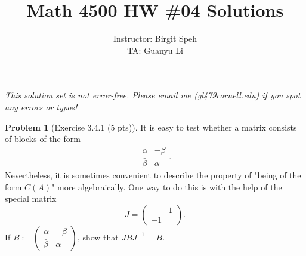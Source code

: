 \documentclass{article}
\title{Math 4500 HW \#04 Solutions}
\author{Instructor: Birgit Speh\\ TA: Guanyu Li}
\date{}
\theoremstyle{definition}
\newtheorem{problem}{Problem}
\theoremstyle{plain}
\begin{document}
\maketitle\par

\emph{This solution set is not error-free. Please email me (gl479\MVAt cornell.edu) if you spot any errors or typos!}

\begin{problem}[Exercise 3.4.1 (5 pts)]It is easy to test whether a matrix consists of blocks of the form
\begin{displaymath}
\begin{matrix}\alpha&-\beta\\ \bar{\beta}&\bar{\alpha}\end{matrix}.
\end{displaymath}
Nevertheless, it is sometimes convenient to describe the property of "being of the form $C(A)$" more algebraically. One way to do this is with the help of the special matrix
\begin{displaymath}
J=\begin{pmatrix}&1\\ -1&\end{pmatrix}.
\end{displaymath}
If $B:=\begin{pmatrix}\alpha&-\beta\\ \bar{\beta}&\bar{\alpha}\end{pmatrix}$, show that $JBJ^{-1}=\bar{B}$.
\end{problem}
\end{document}
